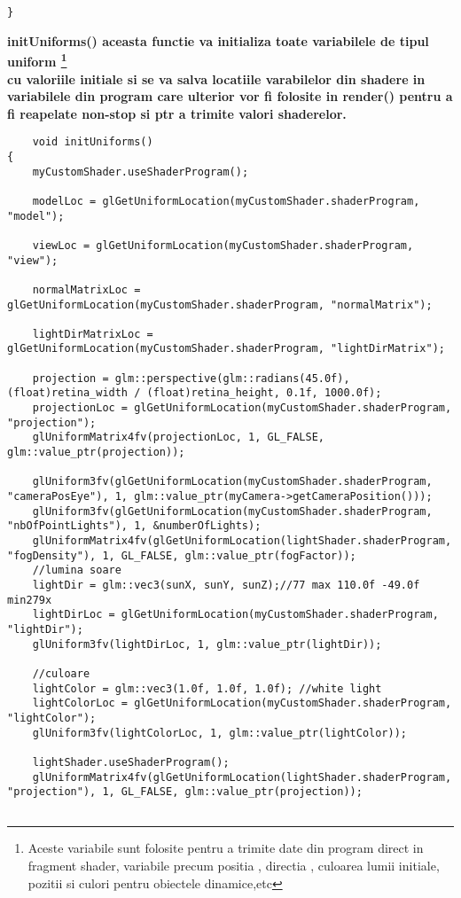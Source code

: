 \begin{itemize}
\begin{verbatim}
}	
	\end{verbatim}

	\tab \tab \bf{initUniforms()} aceasta functie va initializa toate variabilele de tipul uniform \footnote{Aceste variabile sunt folosite pentru a trimite date din program direct in fragment shader, variabile precum positia , directia , culoarea lumii initiale, pozitii si culori  pentru obiectele dinamice,etc }\\ cu valoriile initiale si se va salva locatiile varabilelor din shadere in variabilele din program care ulterior vor fi folosite in render() pentru a fi reapelate non-stop si ptr a trimite valori shaderelor. \\

	\begin{verbatim}
	void initUniforms()	
{
	myCustomShader.useShaderProgram();

	modelLoc = glGetUniformLocation(myCustomShader.shaderProgram, "model");

	viewLoc = glGetUniformLocation(myCustomShader.shaderProgram, "view");
	
	normalMatrixLoc = glGetUniformLocation(myCustomShader.shaderProgram, "normalMatrix");
	
	lightDirMatrixLoc = glGetUniformLocation(myCustomShader.shaderProgram, "lightDirMatrix");

	projection = glm::perspective(glm::radians(45.0f), (float)retina_width / (float)retina_height, 0.1f, 1000.0f);
	projectionLoc = glGetUniformLocation(myCustomShader.shaderProgram, "projection");
	glUniformMatrix4fv(projectionLoc, 1, GL_FALSE, glm::value_ptr(projection));	

	glUniform3fv(glGetUniformLocation(myCustomShader.shaderProgram, "cameraPosEye"), 1, glm::value_ptr(myCamera->getCameraPosition()));
	glUniform3fv(glGetUniformLocation(myCustomShader.shaderProgram, "nbOfPointLights"), 1, &numberOfLights);
	glUniformMatrix4fv(glGetUniformLocation(lightShader.shaderProgram, "fogDensity"), 1, GL_FALSE, glm::value_ptr(fogFactor));
	//lumina soare
	lightDir = glm::vec3(sunX, sunY, sunZ);//77 max 110.0f -49.0f min279x
	lightDirLoc = glGetUniformLocation(myCustomShader.shaderProgram, "lightDir");
	glUniform3fv(lightDirLoc, 1, glm::value_ptr(lightDir));

	//culoare
	lightColor = glm::vec3(1.0f, 1.0f, 1.0f); //white light
	lightColorLoc = glGetUniformLocation(myCustomShader.shaderProgram, "lightColor");
	glUniform3fv(lightColorLoc, 1, glm::value_ptr(lightColor));

	lightShader.useShaderProgram();
	glUniformMatrix4fv(glGetUniformLocation(lightShader.shaderProgram, "projection"), 1, GL_FALSE, glm::value_ptr(projection));


\end{verbatim}
\end{itemize}
